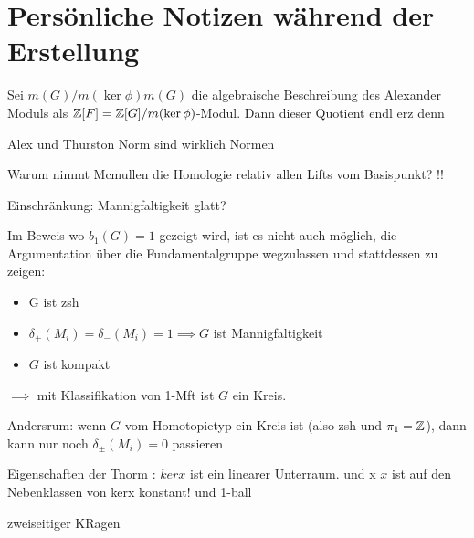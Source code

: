 
\section{Persönliche Notizen während der Erstellung}
	Sei $m(G)/m(\ker \phi)m(G)$ die algebraische Beschreibung des Alexander Moduls als $\mathbb{Z}[F]=\mathbb{Z}[G]/m(\ker \phi)$-Modul. Dann dieser Quotient endl erz denn

	Alex und Thurston Norm sind wirklich Normen 

	Warum nimmt Mcmullen die Homologie relativ allen Lifts vom Basispunkt?  !!

	Einschränkung: Mannigfaltigkeit glatt?

	Im Beweis wo $b_1(G)=1$ gezeigt wird, ist es nicht auch möglich, die Argumentation über die Fundamentalgruppe wegzulassen und stattdessen zu zeigen:
	\begin{itemize}
		\item G ist zsh
		\item $\delta_+(M_i) = \delta_-(M_i)=1 \implies G$ ist Mannigfaltigkeit
		\item $G$ ist kompakt
	\end{itemize}
	$\implies$ mit Klassifikation von 1-Mft ist $G$ ein Kreis.

	Andersrum: wenn $G$ vom Homotopietyp ein Kreis ist (also zsh und $\pi_1=\mathbb{Z}$), dann kann nur noch $\delta_\pm(M_i)=0$ passieren

	Eigenschaften der Tnorm : $kerx$ ist ein linearer Unterraum. und x $x$ ist auf den Nebenklassen von kerx konstant! und 1-ball

	zweiseitiger KRagen
	